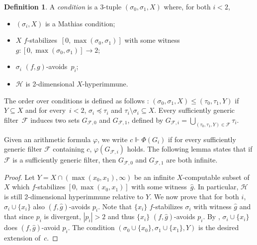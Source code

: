\documentclass{article}
\def\F{\mathcal{F}}
\def\Hc{\mathcal{H}}
\def\F{\mathcal{F}}
\def\Hc{\mathcal{H}}
\numberwithin{theorem}{section}
\newtheorem{lemma}[theorem]{Lemma}
\theoremstyle{definition}
\newtheorem{definition}[theorem]{Definition}
\begin{document}
\begin{definition}
A \emph{condition} is a 3-tuple $(\sigma_0,\sigma_1,X)$ where, for both $i<2$, \begin{itemize}
    \item $(\sigma_i,X)$ is a Mathias condition;
    \item $X$ $f$-stabilizes~$[0, \max(\sigma_0, \sigma_1)]$ with some witness $g : [0, \max(\sigma_0, \sigma_1)] \to 2$;
    \item $\sigma_i$ $(f, g)$-avoids~$p_i$;
    \item $\Hc$ is 2-dimensional $X$-hyperimmune. 
\end{itemize}
\end{definition}

The order over conditions is defined as follows : $(\sigma_0,\sigma_1,X) \leq (\tau_0,\tau_1,Y)$ if $Y \subseteq X$ and for every~$i < 2$, $\sigma_i \preceq \tau_i$ and $\tau_i \setminus \sigma_i \subseteq X$. Every sufficiently generic filter~$\F$ induces two sets $G_{\F, 0}$ and $G_{\F, 1}$, defined by $G_{\F, i} = \bigcup_{(\tau_0,\tau_1,Y) \in \F}\tau_i$.

Given an arithmetic formula $\varphi$, we write $c \Vdash \Phi(G_i)$ if for every sufficiently generic filter $\F$ containing $c$, $\varphi(G_{\F, i})$ holds. The following lemma states that if $\F$ is a sufficiently generic filter, then $G_{\F,0}$ and $G_{\F, 1}$ are both infinite.


\begin{proof}
    Let $Y =  X \cap (\max(x_0, x_1), \infty)$ be an infinite $X$-computable subset of $X$ which $f$-stabilizes $[0, \max(x_0, x_1)]$ with some witness~$\hat g$. In particular, $\Hc$ is still 2-dimensional hyperimmune relative to $Y$. We now prove that for both $i$, $\sigma_i \cup \{ x_i \}$ also $(f,\hat g)$-avoids $p_i$. Note that $\{ x_i \}$ $f$-stabilizes $\sigma_i$ with witness $\hat g$ and that since $p_i$ is divergent, $|p_i|>2$ and thus $\{x_i\}$ $(f,\hat g)$-avoids $p_i$. By , $\sigma_i \cup \{ x_i \}$ does $(f,\hat g)$-avoid $p_i$. The condition $(\sigma_0 \cup \{ x_0 \},\sigma_1 \cup \{ x_1 \} ,Y)$ is the desired extension of~$c$.
\end{proof}
\end{document}
